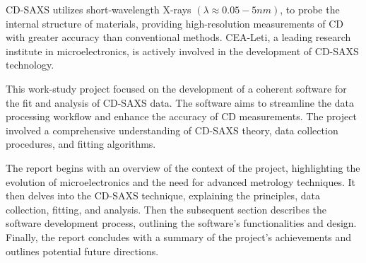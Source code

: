 CD-SAXS utilizes short-wavelength X-rays $(\lambda \approx 0.05 - 5 nm)$, to probe the internal structure of
materials, providing high-resolution measurements of CD with greater accuracy than
conventional methods. CEA-Leti, a leading research institute in microelectronics, is actively involved in
the development of CD-SAXS technology.

\medskip

This work-study project focused on the development of a coherent software for the fit and analysis of CD-SAXS
data. The software aims to streamline the data processing workflow and enhance the accuracy of CD measurements.
The project involved a comprehensive understanding of CD-SAXS theory, data collection procedures, and fitting
algorithms.

\medskip

The report begins with an overview of the context of the project, highlighting the evolution of
microelectronics and the need for advanced metrology techniques. It then delves into the CD-SAXS technique, 
explaining the principles, data collection, fitting, and analysis. Then the subsequent
section describes the software development process, outlining the software's functionalities and design. Finally, the report concludes with a summary of the project's achievements and
outlines potential future directions.